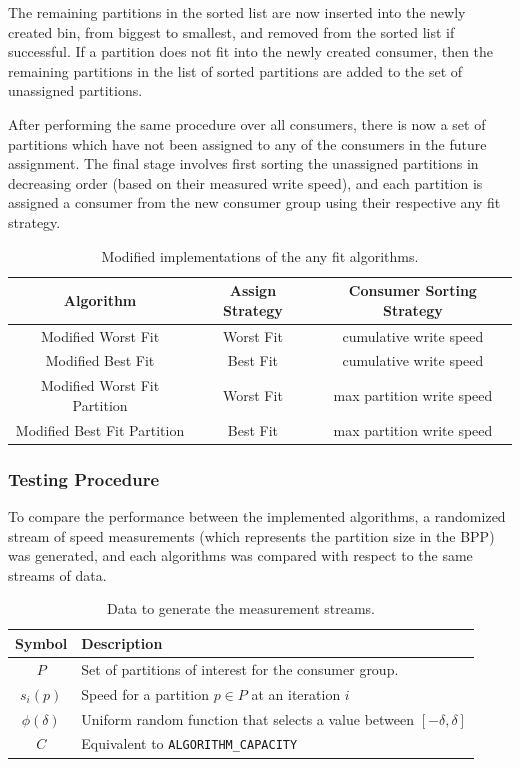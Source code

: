 The remaining partitions in the sorted list are now inserted into the newly
created bin, from biggest to smallest, and removed from the sorted list if
successful. If a partition does not fit into the newly created consumer, then
the remaining partitions in the list of sorted partitions are added to the set
of unassigned partitions.

After performing the same procedure over all consumers, there is now a set of
partitions which have not been assigned to any of the consumers in the future
assignment. The final stage involves first sorting the unassigned partitions in
decreasing order (based on their measured write speed), and each partition is
assigned a consumer from the new consumer group using their respective any fit
strategy.

\begin{table}[H] 
\centering 
\caption{Modified implementations of the any fit algorithms.} 
\begin{tabular}{ |c|c|c| } 
    \hline 
    \textbf{Algorithm} & \textbf{Assign Strategy} & \textbf{Consumer Sorting Strategy} \\ 
    \hline
    Modified Worst Fit & Worst Fit & cumulative write speed \\ 
    Modified Best Fit & Best Fit & cumulative write speed \\ 
    Modified Worst Fit Partition & Worst Fit & max partition write speed \\ 
    Modified Best Fit Partition &  Best Fit & max partition write speed \\
    \hline
\end{tabular} 
\end{table}


\subsubsection{Testing Procedure} \label{c3subsub:testing}

To compare the performance between the implemented algorithms, a randomized
stream of speed measurements (which represents the partition size in the BPP)
was generated, and each algorithms was compared with respect to the same streams
of data. 

\begin{table}[H] 
\centering 
\caption{Data to generate the measurement streams.} 
\label{table:testing_data} 
\begin{tabular}{ |c|l| } 
    \hline 
    \textbf{Symbol} & \textbf{Description} \\ 
    \hline 
    $P$ & Set of partitions of interest for the consumer group. \\ 
    $s_i(p)$ & Speed for a partition $p \in P$ at an iteration $i$ \\ 
    $\phi(\delta)$ & Uniform random function that selects a value between $[-\delta, \delta]$\\
    $C$ & Equivalent to \lstinline$ALGORITHM_CAPACITY$ \\
    \hline 
\end{tabular} 
\end{table}

